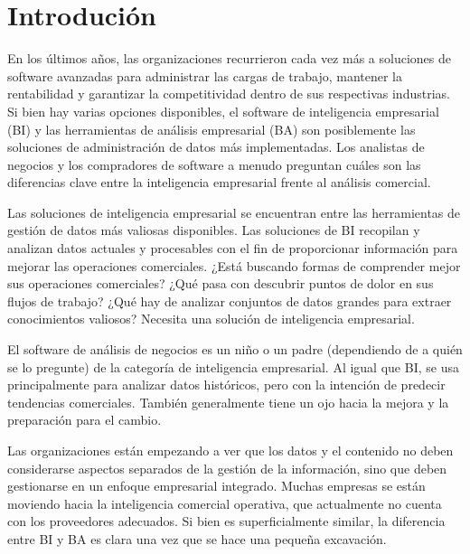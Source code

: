 \section{Introdución} 
\vspace{12mm} %


En los últimos años, las organizaciones recurrieron cada vez más a soluciones de software avanzadas para administrar las cargas de trabajo, mantener la rentabilidad y garantizar la competitividad dentro de sus respectivas industrias. Si bien hay varias opciones disponibles, el software de inteligencia empresarial (BI) y las herramientas de análisis empresarial (BA) son posiblemente las soluciones de administración de datos más implementadas. Los analistas de negocios y los compradores de software a menudo preguntan cuáles son las diferencias clave entre la inteligencia empresarial frente al análisis comercial.

Las soluciones de inteligencia empresarial se encuentran entre las herramientas de gestión de datos más valiosas disponibles. Las soluciones de BI recopilan y analizan datos actuales y procesables con el fin de proporcionar información para mejorar las operaciones comerciales. ¿Está buscando formas de comprender mejor sus operaciones comerciales? ¿Qué pasa con descubrir puntos de dolor en sus flujos de trabajo? ¿Qué hay de analizar conjuntos de datos grandes para extraer conocimientos valiosos? Necesita una solución de inteligencia empresarial.

El software de análisis de negocios es un niño o un padre (dependiendo de a quién se lo pregunte) de la categoría de inteligencia empresarial. Al igual que BI, se usa principalmente para analizar datos históricos, pero con la intención de predecir tendencias comerciales. También generalmente tiene un ojo hacia la mejora y la preparación para el cambio.

Las organizaciones están empezando a ver que los datos y el contenido no deben considerarse aspectos separados de la gestión de la información, sino que deben gestionarse en un enfoque empresarial integrado. Muchas empresas se están moviendo hacia la inteligencia comercial operativa, que actualmente no cuenta con los proveedores adecuados.
Si bien es superficialmente similar, la diferencia entre BI y BA es clara una vez que se hace una pequeña excavación.

		

